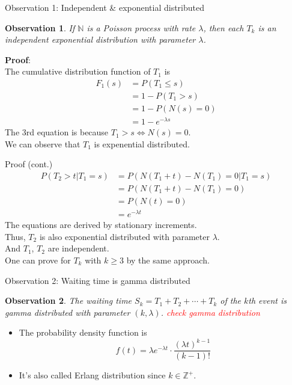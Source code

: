 \documentclass[mathserif]{beamer}
\newtheorem{obs}{Observation}
\begin{document}
\begin{frame}{Observation 1: Independent \& exponential distributed}
\begin{obs}
If $\mathbb{N}$ is a Poisson process with rate $\lambda$,
then each $T_k$ is an independent exponential distribution with parameter $\lambda$.
\end{obs}
\textbf{Proof}:\\
The cumulative distribution function of $T_1$ is
\begin{align*}
F_1(s) & = P(T_1 \leq s) \\
& = 1 - P(T_1 > s) \\
& = 1 - P(N(s) = 0) \\
& = 1 - e^{-\lambda s}
\end{align*}
The 3rd equation is because $T_1 > s \iff N(s) = 0$. \\
We can observe that $T_1$ is expenential distributed.
\end{frame}

\begin{frame}{Proof (cont.)}
\begin{align*}
P(T_2 > t | T_1 = s) & = P(N(T_1+t) - N(T_1) = 0 | T_1 = s) \\
& = P(N(T_1+t) - N(T_1) = 0) \\
& = P(N(t) = 0) \\
& = e^{-\lambda t}
\end{align*}
The equations are derived by stationary increments.\\
\vspace{\baselineskip}
Thus, $T_2$ is also exponential distributed with parameter $\lambda$. \\
And $T_1$, $T_2$ are independent. \\
One can prove for $T_k$ with $k \geq 3$ by the same approach.
\end{frame}

\begin{frame}{Observation 2: Waiting time is gamma distributed}
\begin{obs}
The waiting time $S_k = T_1 + T_2 + \cdots + T_k$ of the $k$th event is gamma distributed with parameter $(k, \lambda)$. \textcolor{red}{check gamma distribution}
\end{obs}
\begin{itemize}
\item The probability density function is
\[
f(t) = \lambda e^{-\lambda t}\cdot \frac{(\lambda t)^{k-1}}{(k-1)!}
\]
\item It's also called Erlang distribution since $k \in \mathbb{Z}^+$.
\end{itemize}
\end{frame}
\end{document}
